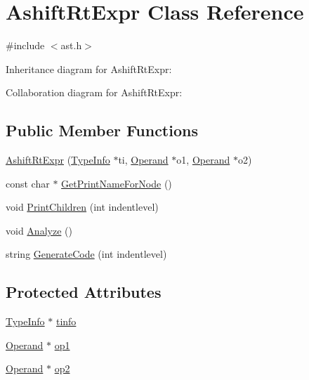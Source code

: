 \hypertarget{class_ashift_rt_expr}{}\section{Ashift\+Rt\+Expr Class Reference}
\label{class_ashift_rt_expr}


{\ttfamily \#include $<$ast.\+h$>$}



Inheritance diagram for Ashift\+Rt\+Expr\+:


Collaboration diagram for Ashift\+Rt\+Expr\+:
\subsection*{Public Member Functions}
\begin{DoxyCompactItemize}
\item 
\hyperlink{class_ashift_rt_expr_a70ad2de1ccc23dfed85711d4c9ad6b3f}{Ashift\+Rt\+Expr} (\hyperlink{class_type_info}{Type\+Info} $\ast$ti, \hyperlink{class_operand}{Operand} $\ast$o1, \hyperlink{class_operand}{Operand} $\ast$o2)
\item 
const char $\ast$ \hyperlink{class_ashift_rt_expr_a59b494552a66bdb8a407acb30d6ddc5b}{Get\+Print\+Name\+For\+Node} ()
\item 
void \hyperlink{class_ashift_rt_expr_a2964d2199eef48495ab173bf2170eb8b}{Print\+Children} (int indentlevel)
\item 
void \hyperlink{class_ashift_rt_expr_a324ffb5777b5ccea0e63eba79e0c67c8}{Analyze} ()
\item 
string \hyperlink{class_ashift_rt_expr_aec58e35be6c2f84aeb345e48777e2370}{Generate\+Code} (int indentlevel)
\end{DoxyCompactItemize}
\subsection*{Protected Attributes}
\begin{DoxyCompactItemize}
\item 
\hyperlink{class_type_info}{Type\+Info} $\ast$ \hyperlink{class_ashift_rt_expr_a553f113d3c2b9dae1165a0b9852dc99a}{tinfo}
\item 
\hyperlink{class_operand}{Operand} $\ast$ \hyperlink{class_ashift_rt_expr_a9559eedf8e5f553ec14eb4503c956ab8}{op1}
\item 
\hyperlink{class_operand}{Operand} $\ast$ \hyperlink{class_ashift_rt_expr_af343100baf13dc58ccbb76a7224ff449}{op2}
\end{DoxyCompactItemize}


